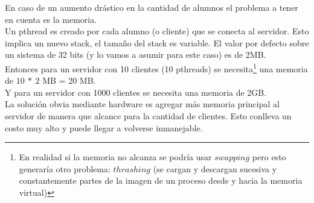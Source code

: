 En caso de un aumento drástico en la cantidad de alumnos el problema a tener en cuenta es la memoria.\\

Un pthread es creado por cada alumno (o cliente) que se conecta al servidor. Esto implica un nuevo stack, 
el tamaño del stack es variable. El valor por defecto sobre un sistema de 32 bits (y lo vamos a asumir para este caso) es de 2MB.\\ 

Entonces para un servidor con 10 clientes (10 pthreads) se necesita\footnote{En realidad si la memoria no alcanza se podría usar $swapping$ pero esto generaría otro problema: $thrashing$ (se cargan y descargan sucesiva y constantemente partes de la imagen de un proceso desde y hacia la memoria virtual)}
una memoria de $10\ *\ 2$ MB = 20 MB.\\
Y para un servidor con 1000 clientes se necesita una memoria de 2GB.\\

La solución obvia mediante hardware es agregar más memoria principal al servidor de manera que alcance para la cantidad de clientes.
Esto conlleva un costo muy alto y puede llegar a volverse inmanejable.\\

